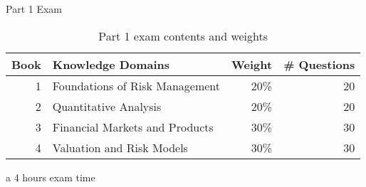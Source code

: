 \documentclass[10pt]{beamer}
\begin{document}
\begin{frame}{Part 1 Exam}{}
\begin{table}
\centering
\caption{Part 1 exam contents and weights}
\begin{threeparttable}[htbp]
	\begin{tabular}{||r|l|r|r||}
		\hline
		\hline
		\multicolumn{1}{||l|}{Book} & Knowledge Domains & \multicolumn{1}{l|}{Weight} & \multicolumn{1}{l||}{\# Questions} \bigstrut\\
		\hline
		1     & Foundations of Risk Management & 20\%  & 20 \bigstrut\\
		\hline
		2     & Quantitative Analysis & 20\%  & 20 \bigstrut\\
		\hline
		3     & Financial Markets and Products & 30\%  & 30 \bigstrut\\
		\hline
		4     & Valuation and Risk Models & 30\%  & 30 \bigstrut\\
		\hline
		\hline
	\end{tabular}
	\begin{tablenotes}
		\item [a] 4 hours exam time 
	\end{tablenotes}
\end{threeparttable}
\label{tab:weights}
\end{table}
\end{frame}
%
%
\end{document}
